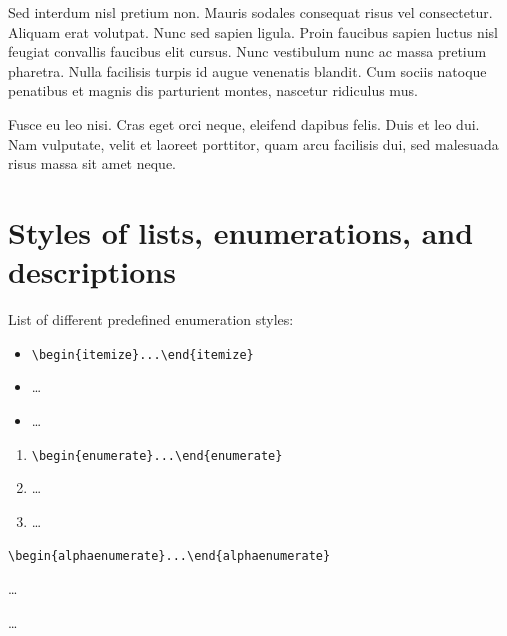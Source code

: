 \documentclass[a4paper,UKenglish,cleveref, autoref]{lipics-v2019}
\begin{document}
\begin{lemma} 
Sed interdum nisl pretium non. Mauris sodales consequat risus vel consectetur. Aliquam erat volutpat. Nunc sed sapien ligula. Proin faucibus sapien luctus nisl feugiat convallis faucibus elit cursus. Nunc vestibulum nunc ac massa pretium pharetra. Nulla facilisis turpis id augue venenatis blandit. Cum sociis natoque penatibus et magnis dis parturient montes, nascetur ridiculus mus.
\end{lemma}

Fusce eu leo nisi. Cras eget orci neque, eleifend dapibus felis. Duis et leo dui. Nam vulputate, velit et laoreet porttitor, quam arcu facilisis dui, sed malesuada risus massa sit amet neque.
%





\appendix

\section{Styles of lists, enumerations, and descriptions}

List of different predefined enumeration styles:

\begin{itemize}
\item \verb|\begin{itemize}...\end{itemize}|
\item \dots
\item \dots
\end{itemize}

\begin{enumerate}
\item \verb|\begin{enumerate}...\end{enumerate}|
\item \dots
\item \dots
\end{enumerate}

\begin{alphaenumerate}
\item \verb|\begin{alphaenumerate}...\end{alphaenumerate}|
\item \dots
\item \dots
\end{alphaenumerate}
\end{document}

